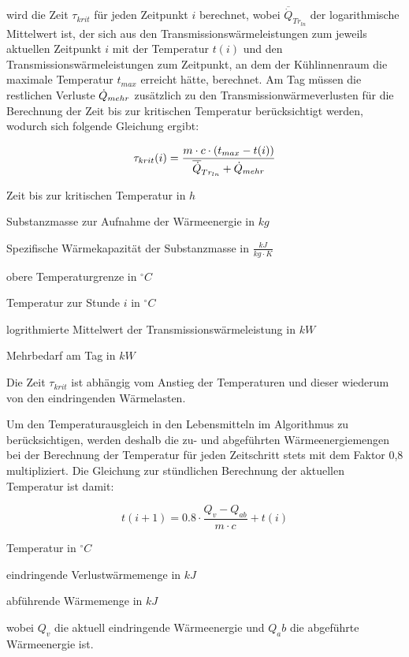 wird die Zeit $\tau_{krit}$ für jeden Zeitpunkt $i$ berechnet, wobei
$\overline{\dot{Q}}_{Tr_{ln}}$ der logarithmische Mittelwert ist, der sich aus
den Transmissionswärmeleistungen zum jeweils aktuellen Zeitpunkt $i$ mit der
Temperatur $t(i)$ und den Transmissionswärmeleistungen zum Zeitpunkt, an dem der
Kühlinnenraum die maximale Temperatur $t_{max}$ erreicht hätte, berechnet. Am
Tag müssen die restlichen Verluste $\pmehr$ zusätzlich zu den
Transmissionwärmeverlusten für die Berechnung der Zeit bis zur kritischen
Temperatur berücksichtigt werden, wodurch sich folgende Gleichung ergibt:

\begin{equation}
	\tau_{krit}(i) = \frac{m \cdot c \cdot (t_{max} -
		t(i))}{{\overline{\dot{Q}}_{Tr_{ln}}} + \pmehr}
\label{taukd}
\end{equation}

\begin{description}[\dth]

	\item[$\tau_{krit}$] Zeit bis zur kritischen Temperatur in $h$
	\item[$m$] Substanzmasse zur Aufnahme der Wärmeenergie in $kg$
	\item[$c$] Spezifische Wärmekapazität der Substanzmasse in $\frac{kJ}{kg
		\cdot K}$
	\item[$t_{max}$] obere Temperaturgrenze in $ ^{\circ} C $
	\item[$t(i)$] Temperatur zur Stunde $i$ in $ ^{\circ} C $
	\item[$\aptranslog$] logrithmierte Mittelwert der
		Transmissionswärmeleistung in $kW$
	\item[$\pmehr$] Mehrbedarf am Tag in $kW$

\end{description}
\vspace{0.5cm}

Die Zeit $\tau_{krit}$ ist abhängig vom Anstieg der Temperaturen und dieser
wiederum von den eindringenden Wärmelasten.

Um den Temperaturausgleich in den Lebensmitteln im Algorithmus zu
berücksichtigen, werden deshalb die zu- und abgeführten Wärmeenergiemengen bei
der Berechnung der Temperatur für jeden Zeitschritt stets mit dem Faktor 0,8
multipliziert.  Die Gleichung zur stündlichen Berechnung der aktuellen
Temperatur ist damit:

\begin{equation}
	t(i+1) = 0.8 \cdot \frac{Q_v - Q_{ab}}{m \cdot c} + t(i)
\label{tns}
\end{equation}

\begin{description}[\dth]

	\item[$t$] Temperatur in $^{\circ} C$
	\item[$Q_v$] eindringende Verlustwärmemenge in $kJ$
	\item[$Q_{ab}$] abführende Wärmemenge in $kJ$

\end{description}
\vspace{0.5cm}

wobei $Q_v$ die aktuell eindringende Wärmeenergie und $Q_ab$ die abgeführte
Wärmeenergie ist.
